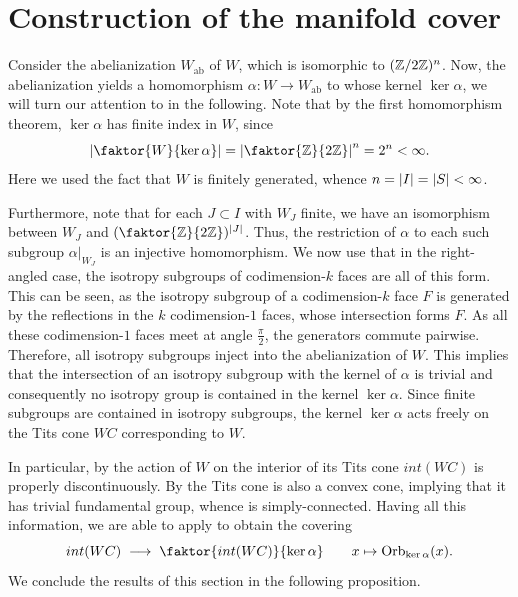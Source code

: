 \section{Construction of the manifold cover}

Consider the abelianization \(W_{\text{ab}}\) of \(W\), which is isomorphic to \((\mathbb{Z}/2\mathbb{Z})^{n}\).
Now, the abelianization yields a homomorphism \(\alpha : W \to W_{\text{ab}}\) to whose kernel \(\ker\alpha\), we will turn our attention to in the following.
Note that by the first homomorphism theorem, \(\ker\alpha\) has finite index in \(W\), since
\[\abs{\faktor{W}{\ker\alpha}} = \abs{\faktor{\Z}{2\Z}}^{n} = 2^{n} < \infty.\]
Here we used the fact that \(W\) is finitely generated, whence \(n = \left\vert I\right\vert = \left\vert S\right\vert < \infty\).

Furthermore, note that for each \(J \subset I\) with \(W_J\) finite, we have an isomorphism between \(W_J\) and \((\faktor{\Z}{2\Z})^{\abs{J}}\).
Thus, the restriction of \(\alpha\) to each such subgroup \(\alpha\vert_{W_J}\) is an injective homomorphism.
We now use that in the right-angled case, the isotropy subgroups of codimension-\(k\) faces are all of this form.
This can be seen, as the isotropy subgroup of a codimension-\(k\) face \(F\) is generated by the reflections in the \(k\) codimension-\(1\) faces, whose intersection forms \(F\).
As all these codimension-\(1\) faces meet at angle \(\frac{\pi}{2}\), the generators commute pairwise.
Therefore, all isotropy subgroups inject into the abelianization of \(W\).
This implies that the intersection of an isotropy subgroup with the kernel of \(\alpha\) is trivial and consequently no isotropy group is contained in the kernel \(\ker\alpha\).
Since finite subgroups are contained in isotropy subgroups, the kernel \(\ker\alpha\) acts freely on the Tits cone \(WC\) corresponding to \(W\).

In particular, by  the action of \(W\) on the interior of its Tits cone \(int(WC)\) is properly discontinuously.
By  the Tits cone is also a convex cone, implying that it has trivial fundamental group, whence is simply-connected.
Having all this information, we are able to apply  to obtain the covering
\[int(WC) \;\longrightarrow\; \faktor{int(WC)}{\ker\alpha} \qquad x \mapsto \text{Orb}_{\ker\alpha}(x).\]
We conclude the results of this section in the following proposition.

